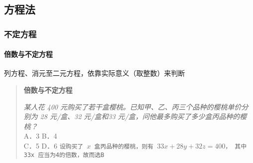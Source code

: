 \subsection{方程法}

\subsubsection{不定方程}

\paragraph{倍数与不定方程} 列方程、消元至二元方程，依靠实际意义（取整数）来判断

\begin{quote}
	\textbf{倍数与不定方程}
	\begin{tcolorbox}[colback=red!5!white, colframe=red!75!black, title=倍数与不定方程]
		\textit{某人花 400 元购买了若干盒樱桃。已知甲、乙、丙三个品种的樱桃单价分别为 28 元/盒、32 元/盒和33 元/盒，问他最多购买了多少盒丙品种的樱桃？}\\
		A．3 B．4\\
		C．5 D．6
		\tcblower%
		\texttt{设购买了 $x$ 盒丙品种的樱桃，则有 $33x + 28y + 32z = 400$， 其中 33x 应当为4的倍数，故而选B}
	\end{tcolorbox}
\end{quote}
